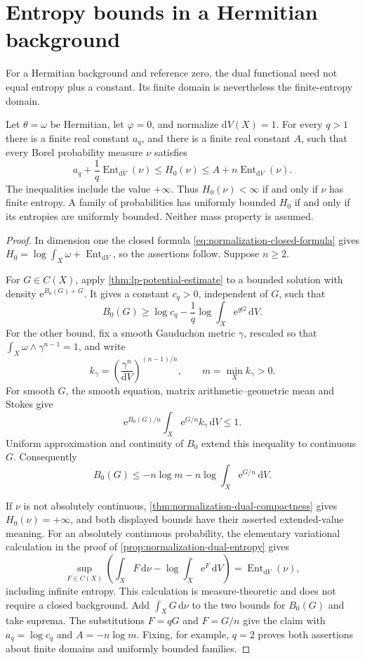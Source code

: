 \section{Entropy bounds in a Hermitian background}

For a Hermitian background and reference zero, the dual functional need not equal entropy plus a constant. Its finite domain is nevertheless the finite-entropy domain.

\begin{proposition}\label{prop:hermitian-dual-entropy-bounds}
Let $\theta=\omega$ be Hermitian, let $\varphi=0$, and normalize $\mathrm{d}V(X)=1$. For every $q>1$ there is a finite real constant $a_q$, and there is a finite real constant $A$, such that every Borel probability measure $\nu$ satisfies
\[
 a_q+\frac1q\operatorname{Ent}_{\mathrm{d}V}(\nu)
 \leq H_0(\nu)
 \leq A+n\operatorname{Ent}_{\mathrm{d}V}(\nu).
\]
The inequalities include the value $+\infty$. Thus $H_0(\nu)<\infty$ if and only if $\nu$ has finite entropy. A family of probabilities has uniformly bounded $H_0$ if and only if its entropies are uniformly bounded. Neither mass property is assumed.
\end{proposition}
\begin{proof}
In dimension one the closed formula \eqref{eq:normalization-closed-formula} gives $H_0=\log\int_X\omega+\operatorname{Ent}_{\mathrm{d}V}$, so the assertions follow. Suppose $n\geq2$.

For $G\in C(X)$, apply \cref{thm:lp-potential-estimate} to a bounded solution with density $\mathrm{e}^{B_0(G)+G}$. It gives a constant $c_q>0$, independent of $G$, such that
\[
 B_0(G)\geq\log c_q-\frac1q\log\int_X\mathrm{e}^{qG}\,\mathrm{d}V.
\]
For the other bound, fix a smooth Gauduchon metric $\gamma$, rescaled so that $\int_X\omega\wedge\gamma^{n-1}=1$, and write
\[
 k_\gamma=\left(\frac{\gamma^n}{\mathrm{d}V}\right)^{(n-1)/n},
 \qquad m=\min_X k_\gamma>0.
\]
For smooth $G$, the smooth equation, matrix arithmetic--geometric mean and Stokes give
\[
 \mathrm{e}^{B_0(G)/n}\int_X\mathrm{e}^{G/n}k_\gamma\,\mathrm{d}V\leq1.
\]
Uniform approximation and continuity of $B_0$ extend this inequality to continuous $G$. Consequently
\[
 B_0(G)\leq-n\log m-n\log\int_X\mathrm{e}^{G/n}\,\mathrm{d}V.
\]

If $\nu$ is not absolutely continuous, \cref{thm:normalization-dual-compactness} gives $H_0(\nu)=+\infty$, and both displayed bounds have their asserted extended-value meaning. For an absolutely continuous probability, the elementary variational calculation in the proof of \cref{prop:normalization-dual-entropy} gives
\[
 \sup_{F\in C(X)}\left(\int_XF\,\mathrm{d}\nu
                 -\log\int_X\mathrm{e}^F\,\mathrm{d}V\right)
       =\operatorname{Ent}_{\mathrm{d}V}(\nu),
\]
including infinite entropy. This calculation is measure-theoretic and does not require a closed background. Add $\int_XG\,\mathrm{d}\nu$ to the two bounds for $B_0(G)$ and take suprema. The substitutions $F=qG$ and $F=G/n$ give the claim with $a_q=\log c_q$ and $A=-n\log m$. Fixing, for example, $q=2$ proves both assertions about finite domains and uniformly bounded families.
\end{proof}

